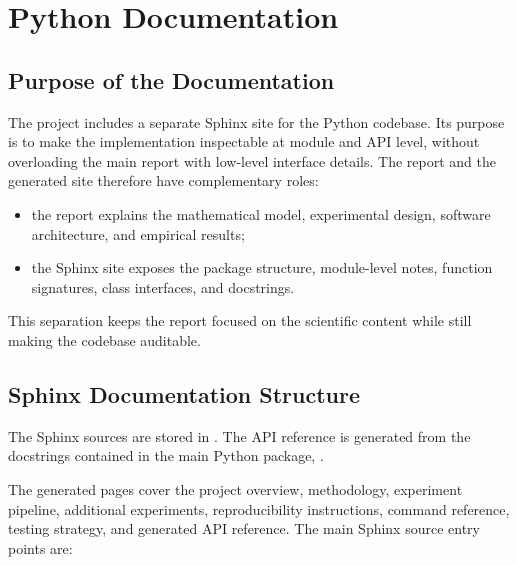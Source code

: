 \chapter{Python Documentation}

\section{Purpose of the Documentation}

The project includes a separate Sphinx site for the Python codebase.
Its purpose is to make the implementation inspectable at module and API level, without overloading the main report with low-level interface details.
The report and the generated site therefore have complementary roles:

\begin{itemize}
    \item the report explains the mathematical model, experimental design, software architecture, and empirical results;
    \item the Sphinx site exposes the package structure, module-level notes, function signatures, class interfaces, and docstrings.
\end{itemize}
This separation keeps the report focused on the scientific content while still making the codebase auditable.

\section{Sphinx Documentation Structure}

The Sphinx sources are stored in .
The API reference is generated from the docstrings contained in the main Python package, .

The generated pages cover the project overview, methodology, experiment pipeline, additional experiments,
reproducibility instructions, command reference, testing strategy, and generated API reference.
The main Sphinx source entry points are:

